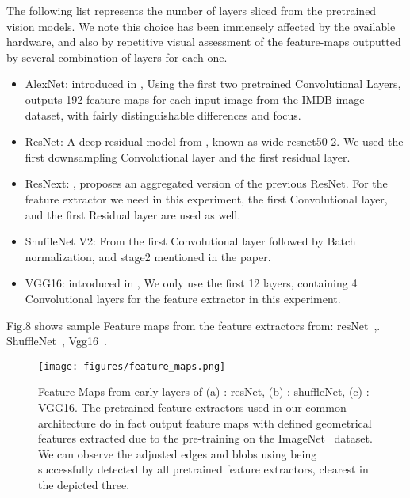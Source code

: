 \documentclass[conference]{IEEEtran}
\begin{document}
The following list represents the number of layers sliced from the pretrained vision models. We note this choice has been immensely affected by the available hardware, and also by repetitive visual assessment of the feature-maps outputted by several combination of layers for each one.
\begin{itemize}
			 \item{AlexNet: introduced in \cite{alexnet}, Using the first two pretrained Convolutional Layers, outputs
						192 feature maps for each input image from the IMDB-image dataset, 
						with fairly distinguishable differences and focus.}

			 \item  ResNet: A deep residual model from \cite{resnet}, known as wide-resnet50-2. We used the first downsampling Convolutional layer and the first residual layer.

			 \item  ResNext: \cite{resnext},
						proposes an aggregated version of the previous ResNet. For
						the feature extractor we need in this experiment, the first Convolutional layer,
						and the first Residual layer are used as well.

			 \item ShuffleNet V2: From \cite{shufflenetv2} 
							the first Convolutional layer followed by Batch normalization,
							and stage2 mentioned in the paper. 

			 \item VGG16: introduced in \cite{vgg16},
					We only use the first 12 layers, containing 4 Convolutional layers for the feature extractor in this experiment.
			 
\end{itemize}
Fig.8 shows sample Feature maps from the feature extractors from:
				resNet~\cite{resnet},. ShuffleNet~\cite{shufflenetv2}, Vgg16~\cite{vgg16}.
				
			    \begin{figure}[hbt!]
                \centerline{\texttt{[image: figures/feature\_maps.png]}}
                \caption{Feature Maps from early layers of (a) : resNet, (b) : shuffleNet, (c) : VGG16. The pretrained feature extractors used in our common architecture do in fact output feature maps with defined geometrical features extracted due to the pre-training on the ImageNet~\cite{imagenet} dataset. We can observe the adjusted edges and blobs using  being successfully detected by all pretrained feature extractors, clearest in the depicted three.}
                \label{figure-6}
                \end{figure}
\end{document}
